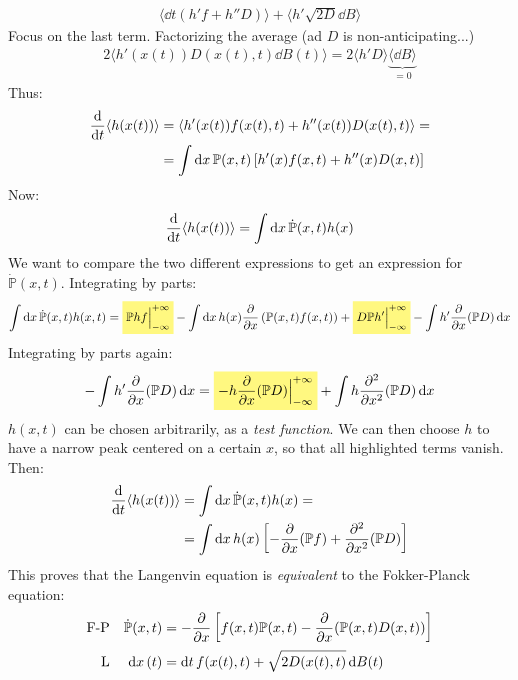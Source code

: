 \documentclass[../template.tex]{subfiles}
\begin{document}
\begin{align*}
    \langle \dd{t} (h' f + h'' D) \rangle + \langle h' \sqrt{2D} \dd{B} \rangle
\end{align*}
Focus on the last term. Factorizing the average (ad $D$ is non-anticipating...)
\begin{align*}
    2 \langle h' (x(t)) D(x(t),t) \dd{B(t)} \rangle = 2 \langle h' D \rangle \underbrace{\langle \dd{B} \rangle}_{=0} 
\end{align*}
Thus:
\begin{align*}
    \dv{t} \langle h(x(t)) \rangle &= \langle h'(x(t)) f(x(t),t) + h''(x(t)) D(x(t),t) \rangle =\\
    &= \int \dd{x} \mathbb{P}(x,t) \left[h'(x) f(x,t) + h''(x) D(x,t)\right]
\end{align*}
Now:
\begin{align*}
    \dv{t} \langle h(x(t)) \rangle = \int \dd{x} \dot{\mathbb{P}}(x,t) h(x)
\end{align*}
We want to compare the two different expressions to get an expression for $\dot{\mathbb{P}}(x,t)$. Integrating by parts:
\begin{align*}
    \int \dd{x} \dot{\mathbb{P}}(x,t) h(x,t) = \hlc{Yellow}{\mathbb{P} h f \Big|_{-\infty}^{+\infty}}- \int \dd{x} h(x) \pdv{x} \left(\mathbb{P}(x,t) f(x,t)\right) +\hlc{Yellow}{ D\mathbb{P}h'\Big|_{-\infty}^{+\infty}}- \int h' \pdv{x}(\mathbb{P} D) \dd{x}
\end{align*} 
Integrating by parts again:
\begin{align*}
    -\int h' \pdv{x} (\mathbb{P} D) \dd{x} = \hlc{Yellow}{- h \pdv{x} (\mathbb{P} D) \Big|_{-\infty}^{+\infty}} + \int h \pdv[2]{x} (\mathbb{P} D) \dd{x}
\end{align*}
$h(x,t)$ can be chosen arbitrarily, as a \textit{test function}. We can then choose $h$ to have a narrow peak centered on a certain $x$, so that all highlighted terms vanish. Then:
\begin{align*}
    \dv{t} \langle h(x(t)) \rangle &= \int \dd{x} \dot{\mathbb{P}}(x,t) h(x) =\\
    &= \int \dd{x} h(x) \left[-\pdv{x} (\mathbb{P} f) + \pdv[2]{x} (\mathbb{P} D)\right]
\end{align*}
This proves that the Langenvin equation is \textit{equivalent} to the Fokker-Planck equation:
\begin{align*}
    \text{F-P} && \dot{\mathbb{P}}(x,t) &= -\pdv{x}\left[f(x,t) \mathbb{P}(x,t) - \pdv{x}(\mathbb{P}(x,t) D(x,t))\right]\\
    \text{L} && \dd{x}(t) &= \dd{t} f(x(t),t) + \sqrt{2D(x(t),t)} \dd{B(t)}
\end{align*} 
\end{document}
